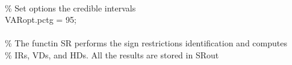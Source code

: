 \hspace{1mm}\hspace{5mm} \hspace{5mm} \hspace{5mm} \hspace{5mm} \hspace{5mm} \hspace{5mm}  \\ 
\hspace{1mm}\hspace{5mm} \hspace{5mm} \hspace{5mm} \hspace{5mm} \hspace{5mm} \hspace{5mm} \textcolor{matlabgreen}{\% Set options the credible intervals }\\ 
\hspace{1mm}\hspace{5mm} \hspace{5mm} \hspace{5mm} \hspace{5mm} \hspace{5mm} \hspace{5mm} VARopt.pctg = 95; \\ 
\hspace{1mm}\hspace{5mm} \hspace{5mm} \hspace{5mm} \hspace{5mm} \hspace{5mm} \hspace{5mm}  \\ 
\hspace{1mm}\hspace{5mm} \hspace{5mm} \hspace{5mm} \hspace{5mm} \hspace{5mm} \hspace{5mm} \textcolor{matlabgreen}{\% The functin SR performs the sign restrictions identification and computes }\\ 
\hspace{1mm}\hspace{5mm} \hspace{5mm} \hspace{5mm} \hspace{5mm} \hspace{5mm} \hspace{5mm} \textcolor{matlabgreen}{\% IRs, VDs, and HDs. All the results are stored in SRout }\\ 
